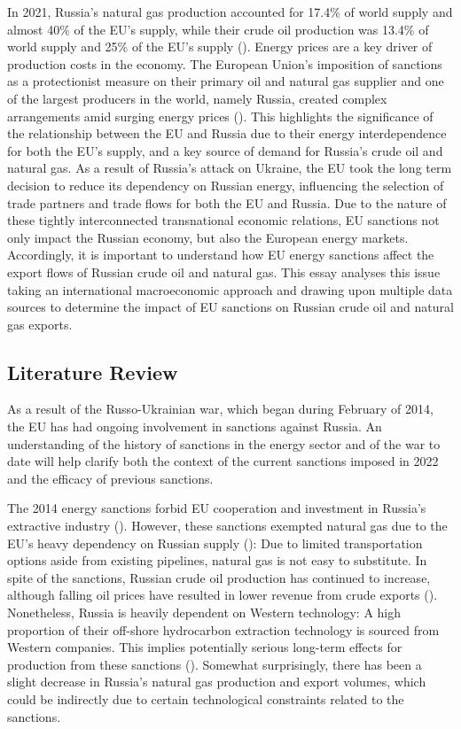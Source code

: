 \documentclass[12pt]{article}
\begin{document}
 In 2021, Russia's natural gas production accounted for 17.4\% of world supply and almost 40\% of the EU's supply, while their crude oil production was 13.4\% of world supply and 25\% of the EU's supply (\citeauthor{bp_2022}). Energy prices are a key driver of production costs in the economy. The European Union's imposition of sanctions as a protectionist measure on their primary oil and natural gas supplier and one of the largest producers in the world, namely Russia, created complex arrangements amid surging energy prices (\citeauthor{ember_2023}). This highlights the significance of the relationship between the EU and Russia due to their energy interdependence for both the EU's supply, and a key source of demand for Russia's crude oil and natural gas. As a result of Russia's attack on Ukraine, the EU took the long term decision to reduce its dependency on Russian energy, influencing the selection of trade partners and trade flows for both the EU and Russia. Due to the nature of these tightly interconnected transnational economic relations, EU sanctions not only impact the Russian economy, but also the European energy markets. Accordingly, it is important to understand how EU energy sanctions affect the export flows of Russian crude oil and natural gas. This essay analyses this issue taking an international macroeconomic approach and drawing upon multiple data sources to determine the impact of EU sanctions on Russian crude oil and natural gas exports.
 

\subsection{Literature Review}

As a result of the Russo-Ukrainian war, which began during February of 2014, the EU has had ongoing involvement in sanctions against Russia. An understanding of the history of sanctions in the energy sector and of the war to date will help clarify both the context of the current sanctions imposed in 2022 and the efficacy of previous sanctions.

The 2014 energy sanctions forbid EU cooperation and investment in Russia's extractive industry (\citeauthor{the_council_of_the_european_union_2014}). However, these sanctions exempted natural gas due to the EU's heavy dependency on Russian supply (\citeauthor{szczepański_2015}): Due to limited transportation options aside from existing pipelines, natural gas is not easy to substitute. In spite of the sanctions, Russian crude oil production has continued to increase, although falling oil prices have resulted in lower revenue from crude exports (\citeauthor{russell_2016}). Nonetheless, Russia is heavily dependent on Western technology: A high proportion of their off-shore hydrocarbon extraction technology is sourced from Western companies. This implies potentially serious long-term effects for production from these sanctions (\citeauthor{strategic_comments_2015}). Somewhat surprisingly, there has been a slight decrease in Russia's natural gas production and export volumes, which could be indirectly due to certain technological constraints related to the sanctions.
\end{document}
